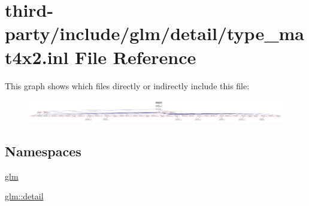 \hypertarget{type__mat4x2_8inl}{}\section{third-\/party/include/glm/detail/type\+\_\+mat4x2.inl File Reference}
\label{type__mat4x2_8inl}
This graph shows which files directly or indirectly include this file\+:
\nopagebreak
\begin{figure}[H]
\begin{center}
\leavevmode
\includegraphics[width=350pt]{type__mat4x2_8inl__dep__incl}
\end{center}
\end{figure}
\subsection*{Namespaces}
\begin{DoxyCompactItemize}
\item 
 \hyperlink{namespaceglm}{glm}
\item 
 \hyperlink{namespaceglm_1_1detail}{glm\+::detail}
\end{DoxyCompactItemize}
